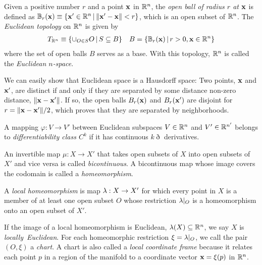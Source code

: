 \documentclass[11pt]{article}
\numberwithin{equation}{section}
\begin{document}
\begin{dfn}
Given a positive number $r$ and a point $\mathbf{x}$ in $\mathbb{R}^n$, the \textit{open ball of radius $r$ at $\mathbf{x}$} is defined as $\mathbb{B}_r(\mathbf{x})\equiv\{\mathbf{x}'\in\mathbb{R}^n\,|\,\|\mathbf{x}'-\mathbf{x}\|<r\}$, which is an open subset of $\mathbb{R}^n$.
The \textit{Euclidean topology} on $\mathbb{R}^n$ is given by
\begin{align}
  T_{\mathbb{R}^n}
\equiv
  \{
    \cup_{O\in S}
    O
  \,|\,
    S
  \subseteq
    B
  \}
&&
  B
=
  \{
    \mathbb{B}_r(\mathbf{x})
  \,|\,
    r>0,
    \mathbf{x}\in\mathbb{R}^n
  \}
\end{align}
where the set of open balls $B$ serves as a base.
With this topology, $\mathbb{R}^n$ is called the \textit{Euclidean $n$-space}.
\end{dfn}

\begin{ex}
We can easily show that Euclidean space is a Hausdorff space:
Two points, $\mathbf{x}$ and $\mathbf{x}'$, are distinct if and only if they are separated by some distance non-zero distance, $\|\mathbf{x}-\mathbf{x}'\|$.
If so, the open balls $B_r(\mathbf{x})$ and $B_r(\mathbf{x}')$ are disjoint for $r=\|\mathbf{x}-\mathbf{x}'\|/2$, which proves that they are separated by neighborhoods.
\end{ex}

\begin{dfn}
A mapping  $\varphi:V\rightarrow V'$ between Euclidean subspaces $V\in \mathbb{R}^n$ and $V'\in\mathbb{R}^{n'}$ belongs to \textit{differentiability class $C^k$} if it has continuous $k\eth$ derivatives.
\end{dfn}


\begin{dfn}
An invertible map $\mu:X\rightarrow X'$ that takes open subsets of $X$ into open subsets of $X'$ and vice versa is called \textit{bicontinuous}.
A bicontinuous map whose image covers the codomain is called a \textit{homeomorphism}.
\end{dfn}

\begin{dfn}
A \textit{local homeomorphism} is map $\lambda :X\rightarrow X'$ for which every point in $X$ is a member of at least one open subset $O$ whose restriction $\lambda |_O$ is a homeomorphism onto an open subset of $X'$.
\end{dfn}


\begin{dfn}
If the image of a local homeomorphism is Euclidean, $\lambda (X)\subseteq\mathbb{R}^n$, we say $X$ is \textit{locally~Euclidean}.
For each homeomorphic restriction $\xi=\la|_O$, we call the pair $(O, \xi)$ a \textit{chart}.
A chart is also called a \textit{local coordinate frame} because it relates each point $p$ in a region of the manifold to a coordinate vector $\bo{x}=\xi(p)$ in $\mathbb{R}^n$.
\end{dfn}
\end{document}
